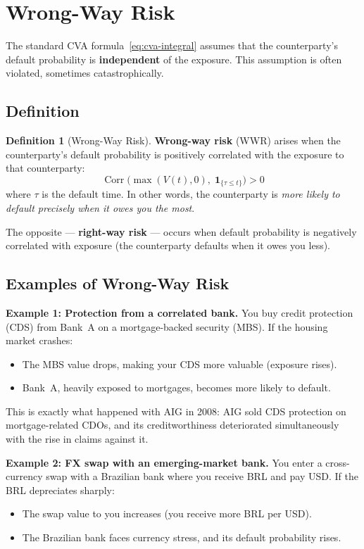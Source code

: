 \documentclass[11pt, a4paper]{article}
\theoremstyle{definition}
\newtheorem{definition}{Definition}[section]
\theoremstyle{plain}
\theoremstyle{remark}
\newcommand{\ind}{\boldsymbol{1}}
\begin{document}
\section{Wrong-Way Risk}
\label{sec:wrong-way-risk}

The standard CVA formula~\eqref{eq:cva-integral} assumes that the counterparty's
default probability is \textbf{independent} of the exposure.
This assumption is often violated, sometimes catastrophically.

\subsection{Definition}

\begin{definition}[Wrong-Way Risk]\label{def:wwr}
\textbf{Wrong-way risk} (WWR) arises when the counterparty's default probability
is positively correlated with the exposure to that counterparty:
\[
    \operatorname{Corr}\bigl(\max(V(t), 0),\; \ind_{\{\tau \leq t\}}\bigr) > 0
\]
where $\tau$ is the default time.
In other words, the counterparty is \emph{more likely to default precisely when
it owes you the most}.
\end{definition}

The opposite --- \textbf{right-way risk} --- occurs when default probability is
negatively correlated with exposure (the counterparty defaults when it owes you less).

\subsection{Examples of Wrong-Way Risk}

\textbf{Example 1: Protection from a correlated bank.}
You buy credit protection (CDS) from Bank~A on a mortgage-backed security (MBS).
If the housing market crashes:
\begin{itemize}
    \item The MBS value drops, making your CDS more valuable (exposure rises).
    \item Bank~A, heavily exposed to mortgages, becomes more likely to default.
\end{itemize}
This is exactly what happened with AIG in 2008: AIG sold CDS protection on
mortgage-related CDOs, and its creditworthiness deteriorated simultaneously
with the rise in claims against it.

\textbf{Example 2: FX swap with an emerging-market bank.}
You enter a cross-currency swap with a Brazilian bank where you receive BRL
and pay USD\@.
If the BRL depreciates sharply:
\begin{itemize}
    \item The swap value to you increases (you receive more BRL per USD).
    \item The Brazilian bank faces currency stress, and its default probability rises.
\end{itemize}
\end{document}
